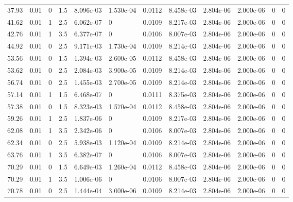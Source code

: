 \documentclass[preview]{standalone}
\begin{document}
{{\begin{tabular}{L{1.2cm}C{1.2cm} C{0.3cm}C{0.5cm} C{1.4cm}C{1.4cm} C{1.4cm}C{1.4cm} C{1.6cm}C{1.6cm} C{1.6cm}C{1.6cm}}
  37.93  &  0.01  & 0     & 1.5 &  8.096e-03  & 1.530e-04  &  0.0112&   8.458e-03& 2.804e-06 & 2.000e-06   &  0 & 0  \\ 
  41.62  &  0.01  & 1     & 2.5 &  6.062e-07  & 0  &  0.0109&   8.217e-03& 2.804e-06 & 2.000e-06   &  0 & 0  \\ 
  42.76  &  0.01  & 1     & 3.5 &  6.377e-07  & 0  &  0.0106&   8.007e-03& 2.804e-06 & 2.000e-06   &  0 & 0  \\ 
  44.92  &  0.01  & 0     & 2.5 &  9.171e-03  & 1.730e-04  &  0.0109&   8.214e-03& 2.804e-06 & 2.000e-06   &  0 & 0  \\ 
  53.56  &  0.01  & 0     & 1.5 &  1.394e-03  & 2.600e-05  &  0.0112&   8.458e-03& 2.804e-06 & 2.000e-06   &  0 & 0  \\ 
  53.62  &  0.01  & 0     & 2.5 &  2.084e-03  & 3.900e-05  &  0.0109&   8.214e-03& 2.804e-06 & 2.000e-06   &  0 & 0  \\ 
  56.74  &  0.01  & 0     & 2.5 &  1.455e-03  & 2.700e-05  &  0.0109&   8.214e-03& 2.804e-06 & 2.000e-06   &  0 & 0  \\ 
  57.14  &  0.01  & 1     & 1.5 &  6.468e-07  & 0  &  0.0111&   8.375e-03& 2.804e-06 & 2.000e-06   &  0 & 0  \\ 
  57.38  &  0.01  & 0     & 1.5 &  8.323e-03  & 1.570e-04  &  0.0112&   8.458e-03& 2.804e-06 & 2.000e-06   &  0 & 0  \\ 
  59.26  &  0.01  & 1     & 2.5 &  1.837e-06  & 0  &  0.0109&   8.217e-03& 2.804e-06 & 2.000e-06   &  0 & 0  \\ 
  62.08  &  0.01  & 1     & 3.5 &  2.342e-06  & 0  &  0.0106&   8.007e-03& 2.804e-06 & 2.000e-06   &  0 & 0  \\ 
  62.34  &  0.01  & 0     & 2.5 &  5.938e-03  & 1.120e-04  &  0.0109&   8.214e-03& 2.804e-06 & 2.000e-06   &  0 & 0  \\ 
  63.76  &  0.01  & 1     & 3.5 &  6.382e-07  & 0  &  0.0106&   8.007e-03& 2.804e-06 & 2.000e-06   &  0 & 0  \\ 
  70.29  &  0.01  & 0     & 1.5 &  6.649e-03  & 1.260e-04  &  0.0112&   8.458e-03& 2.804e-06 & 2.000e-06   &  0 & 0  \\ 
  70.29  &  0.01  & 1     & 3.5 &  1.006e-06  & 0  &  0.0106&   8.007e-03& 2.804e-06 & 2.000e-06   &  0 & 0  \\ 
  70.78  &  0.01  & 0     & 2.5 &  1.444e-04  & 3.000e-06  &  0.0109&   8.214e-03& 2.804e-06 & 2.000e-06   &  0 & 0  \\ 
\hline 
\end{tabular} 

}}
\end{document}
